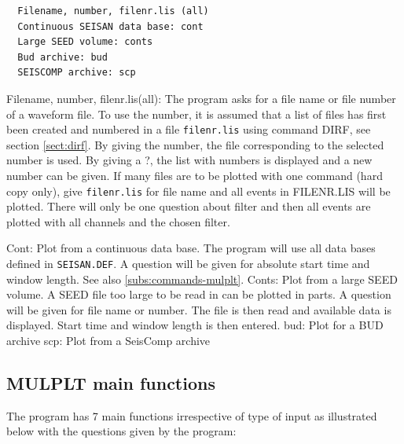\begin{verbatim}
  Filename, number, filenr.lis (all)
  Continuous SEISAN data base: cont
  Large SEED volume: conts
  Bud archive: bud
  SEISCOMP archive: scp
\end{verbatim}

Filename, number, filenr.lis(all): The program asks for a file name 
or file number of a waveform file. To use the 
number, it is assumed that a list of files has first been created 
and numbered in a file \texttt{filenr.lis} using command DIRF, see 
section \ref{sect:dirf}. By giving the number, the file corresponding to the 
selected number is used. By giving a ?, the list with numbers is displayed and a new number can be given. If many files are to be plotted with one command (hard copy only), give \texttt{filenr.lis} for file name and all events in FILENR.LIS will be plotted. There will only be one question about filter and then all events are plotted with all channels and the chosen filter. 

Cont: Plot from a continuous data base. The program will use all data 
bases defined in \texttt{SEISAN.DEF}. A question will be given for 
absolute start time and window length. See also \ref{subs:commands-mulplt}. 
Conts: Plot from a large SEED volume. A SEED file too large to be read in can be plotted in parts. A question will be given for file name or number. The file is then read and available data is displayed. Start time and window length is then entered.\newline
bud: Plot for a BUD archive\newline
scp: Plot from a SeisComp archive

\subsection{MULPLT main functions}
\label{subs:mulplt-main}

The program has 7 main functions irrespective of type of input as illustrated below with the questions given by the program: 



